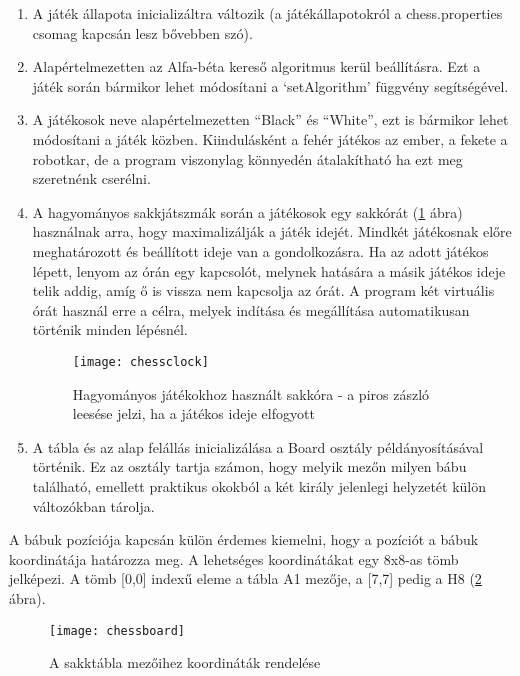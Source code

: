 \documentclass[../documentation.tex]{subfiles}
\begin{document}
\begin{enumerate}
	\item A játék állapota inicializáltra változik (a játékállapotokról a chess.properties csomag kapcsán lesz bővebben szó).
	\item Alapértelmezetten az Alfa-béta kereső algoritmus kerül beállításra. Ezt a játék során bármikor lehet módosítani a `setAlgorithm' függvény segítségével.
	\item A játékosok neve alapértelmezetten ``Black'' és ``White'', ezt is bármikor lehet módosítani a játék közben. Kiindulásként a fehér játékos az ember, a fekete a robotkar, de a program viszonylag könnyedén átalakítható ha ezt meg szeretnénk cserélni.
	\item A hagyományos sakkjátszmák során a játékosok egy sakkórát (\ref{fig:chessclock} ábra) használnak arra, hogy maximalizálják a játék idejét. Mindkét játékosnak előre meghatározott és beállított ideje van a gondolkozásra. Ha az adott játékos lépett, lenyom az órán egy kapcsolót, melynek hatására a másik játékos ideje telik addig, amíg ő is vissza nem kapcsolja az órát. A program két virtuális órát használ erre a célra, melyek indítása és megállítása automatikusan történik minden lépésnél.
\begin{figure}[h]
\centering
\texttt{[image: chessclock]}
\caption{Hagyományos játékokhoz használt sakkóra - a piros zászló leesése jelzi, ha a játékos ideje elfogyott \protect\footnotemark}
\label{fig:chessclock}
\end{figure}
	\item A tábla és az alap felállás inicializálása a Board osztály példányosításával történik. Ez az osztály tartja számon, hogy melyik mezőn milyen bábu található, emellett praktikus okokból a két király jelenlegi helyzetét külön változókban tárolja.
\end{enumerate}

A bábuk pozíciója kapcsán külön érdemes kiemelni, hogy a pozíciót a bábuk koordinátája határozza meg. A lehetséges koordinátákat egy 8x8-as tömb jelképezi. A tömb [0,0] indexű eleme a tábla A1 mezője, a [7,7] pedig a H8 (\ref{fig:chessboard} ábra).

\begin{figure}[h]
\centering
\texttt{[image: chessboard]}
\caption{A sakktábla mezőihez koordináták rendelése}
\label{fig:chessboard}
\end{figure}
\end{document}
